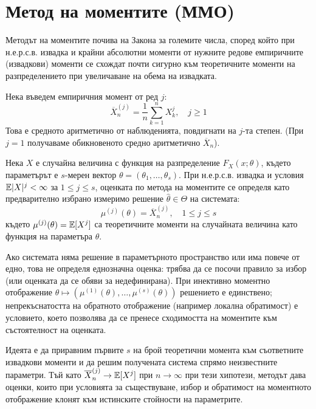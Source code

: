 \section{Метод на моментите (ММО)}

Методът на моментите почива на Закона за големите числа, според който при н.е.р.с.в.
извадка и крайни абсолютни моменти от нужните редове емпиричните (извадкови)
моменти се схождат почти сигурно към теоретичните моменти на разпределението
при увеличаване на обема на извадката.

Нека въведем емпиричния момент от ред $j$:
\[
    \overline{X}_n^{(j)} = \frac{1}{n} \sum_{k=1}^n X_k^j, \quad j \ge 1
\]
Това е средното аритметично от наблюденията, повдигнати на $j$-та степен. (При $j=1$ получаваме обикновеното средно аритметично $\overline{X}_n$).

\begin{defn}[ММО]
Нека $X$ е случайна величина с функция на разпределение $F_X(x; \theta)$, където параметърът е $s$-мерен вектор $\theta = (\theta_1, \dots, \theta_s)$. При н.е.р.с.в. извадка и условия $\mathbb{E}|X|^j<\infty$ за $1\le j\le s$, оценката по метода на моментите се определя като предварително избрано измеримо решение $\hat{\theta}\in\Theta$ на системата:
\[
    \mu^{(j)}(\theta) = \overline{X}_n^{(j)}, \quad 1 \le j \le s
\]
където $\mu^{(j)}(\theta) = \mathbb{E}[X^j]$ са теоретичните моменти на случайната величина като функция на параметъра $\theta$.
\end{defn}

Ако системата няма решение в параметърното пространство или има повече от едно,
това не определя еднозначна оценка: трябва да се посочи правило за избор (или
оценката да се обяви за недефинирана). При инективно моментно отображение
$\theta\mapsto(\mu^{(1)}(\theta),\dots,\mu^{(s)}(\theta))$ решението е единствено;
непрекъснатостта на обратното отображение (например локална обратимост) е
условието, което позволява да се пренесе сходимостта на моментите към
състоятелност на оценката.

Идеята е да приравним първите $s$ на брой теоретични момента към съответните извадкови моменти и да решим получената система спрямо неизвестните параметри. Тъй като $\overline{X}_n^{(j)} \to \mathbb{E}[X^j]$ при $n \to \infty$ при тези хипотези, методът дава оценки, които при условията за съществуване, избор и обратимост на моментното отображение клонят към истинските стойности на параметрите.


